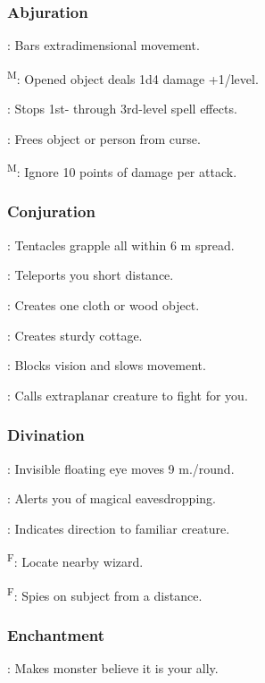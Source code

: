 \subsubsection{Abjuration}
	: Bars extradimensional movement.

	\textsuperscript{M}: Opened object deals 1d4 damage +1/level.

	: Stops 1st- through 3rd-level spell effects.

	: Frees object or person from curse.

	\textsuperscript{M}: Ignore 10 points of damage per attack.

\subsubsection{Conjuration}
	: Tentacles grapple all within 6 m spread.

	: Teleports you short distance.

	: Creates one cloth or wood object.

	: Creates sturdy cottage.

	: Blocks vision and slows movement.

	: Calls extraplanar creature to fight for you.

\subsubsection{Divination}
	: Invisible floating eye moves 9 m./round.

	: Alerts you of magical eavesdropping.

	: Indicates direction to familiar creature.

	\textsuperscript{F}: Locate nearby wizard. %

	\textsuperscript{F}: Spies on subject from a distance.

\subsubsection{Enchantment}
	: Makes monster believe it is your ally.

